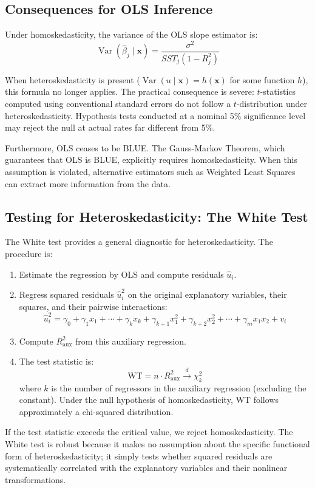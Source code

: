 \subsection{Consequences for OLS Inference}

Under homoskedasticity, the variance of the OLS slope estimator is:
$$\operatorname{Var}(\hat{\beta}_j \mid \mathbf{x}) = \frac{\sigma^2}{SST_j(1 - R_j^2)}$$

When heteroskedasticity is present ($\operatorname{Var}(u \mid \mathbf{x}) = h(\mathbf{x})$ for some function $h$), this formula no longer applies. The practical consequence is severe: $t$-statistics computed using conventional standard errors do not follow a $t$-distribution under heteroskedasticity. Hypothesis tests conducted at a nominal 5\% significance level may reject the null at actual rates far different from 5\%.

Furthermore, OLS ceases to be BLUE. The Gauss-Markov Theorem, which guarantees that OLS is BLUE, explicitly requires homoskedasticity. When this assumption is violated, alternative estimators such as Weighted Least Squares can extract more information from the data.
\subsection{Testing for Heteroskedasticity: The White Test}

The White test provides a general diagnostic for heteroskedasticity. The procedure is:

\begin{enumerate}
\item Estimate the regression by OLS and compute residuals $\hat{u}_i$.
\item Regress squared residuals $\hat{u}_i^2$ on the original explanatory variables, their squares, and their pairwise interactions:
$$\hat{u}_i^2 = \gamma_0 + \gamma_1 x_1 + \cdots + \gamma_k x_k + \gamma_{k+1} x_1^2 + \gamma_{k+2} x_2^2 + \cdots + \gamma_m x_1 x_2 + v_i$$
\item Compute $R^2_{\text{aux}}$ from this auxiliary regression.
\item The test statistic is:
$$\text{WT} = n \cdot R^2_{\text{aux}} \xrightarrow{d} \chi^2_k$$
where $k$ is the number of regressors in the auxiliary regression (excluding the constant). Under the null hypothesis of homoskedasticity, $\text{WT}$ follows approximately a chi-squared distribution.
\end{enumerate}

If the test statistic exceeds the critical value, we reject homoskedasticity. The White test is robust because it makes no assumption about the specific functional form of heteroskedasticity; it simply tests whether squared residuals are systematically correlated with the explanatory variables and their nonlinear transformations.

